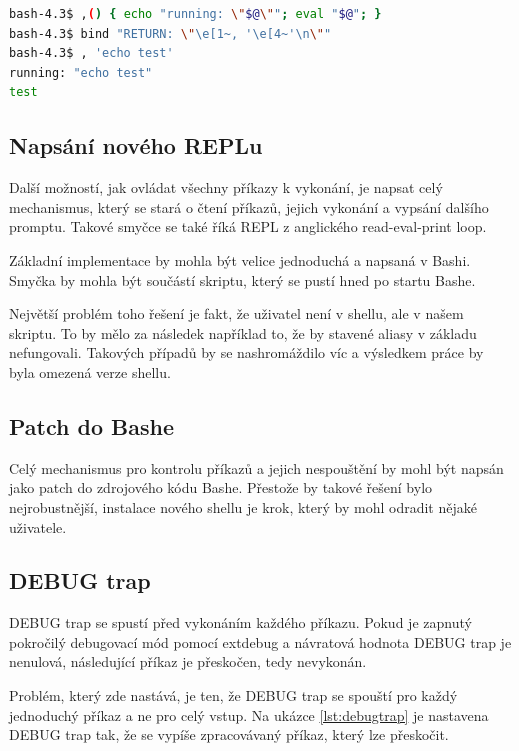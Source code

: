 \documentclass[thesis=M,czech]{FITthesis}[2012/06/26]
\begin{document}
\begin{lstlisting}[language=bash, caption={Modifikace Readline}, label={lst:readline_hack}]
bash-4.3$ ,() { echo "running: \"$@\""; eval "$@"; }
bash-4.3$ bind "RETURN: \"\e[1~, '\e[4~'\n\""
bash-4.3$ , 'echo test'
running: "echo test"
test
\end{lstlisting}

%
%
\subsection{Napsání nového REPLu}

Další možností, jak ovládat všechny příkazy k vykonání, je napsat celý mechanismus, který se stará o čtení příkazů, jejich vykonání a vypsání dalšího promptu. Takové smyčce se také říká REPL z anglického read-eval-print loop.

Základní implementace by mohla být velice jednoduchá a napsaná v Bashi. Smyčka by mohla být součástí skriptu, který se pustí hned po startu Bashe.

Největší problém toho řešení je fakt, že uživatel není v shellu, ale v našem skriptu. To by mělo za následek například to, že by stavené aliasy v základu nefungovali. Takových případů by se nashromáždilo víc a výsledkem práce by byla omezená verze shellu.


%
%
\subsection{Patch do Bashe}

Celý mechanismus pro kontrolu příkazů a jejich nespouštění by mohl být napsán jako patch do zdrojového kódu Bashe. Přestože by takové řešení bylo nejrobustnější, instalace nového shellu je krok, který by mohl odradit nějaké uživatele.

%
%
\subsection{DEBUG trap}

DEBUG trap se spustí před vykonáním každého příkazu. Pokud je zapnutý pokročilý debugovací mód pomocí extdebug a návratová hodnota DEBUG trap je nenulová, následující příkaz je přeskočen, tedy nevykonán.

Problém, který zde nastává, je ten, že DEBUG trap se spouští pro každý jednoduchý příkaz a ne pro celý vstup. Na ukázce \ref{lst:debugtrap} je nastavena DEBUG trap tak, že se vypíše zpracovávaný příkaz, který lze přeskočit.
\end{document}
